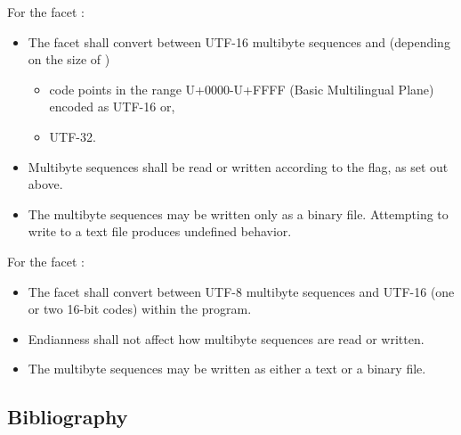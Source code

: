 \documentclass{wg21}
\begin{document}
\pnum
{}%
%
%
For the facet :
\begin{itemize}
    \item
    The facet shall convert between UTF-16 multibyte sequences
    and  (depending on the size of )
    \begin{addedblock}
        \begin{itemize}
            \item code points in the range U+0000-U+FFFF (Basic Multilingual Plane) encoded as UTF-16 or,
            \item UTF-32.
        \end{itemize}
    \end{addedblock}
    \item
    Multibyte sequences shall be read or written
    according to the  flag, as set out above.
    \item
    The multibyte sequences may be written only as a binary file.
    Attempting to write to a text file produces undefined behavior.
\end{itemize}

\pnum
{}%
%
For the facet :
\begin{itemize}
    \item
    The facet shall convert between UTF-8 multibyte sequences
    and UTF-16 (one or two 16-bit codes) within the program.
    \item
    Endianness shall not affect how multibyte sequences are read or written.
    \item
    The multibyte sequences may be written as either a text or a binary file.
\end{itemize}

\pnum
{}


\subsection{Bibliography}
\end{document}
